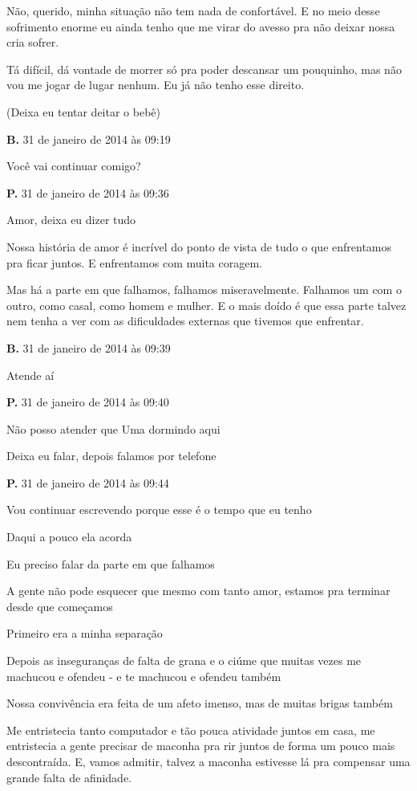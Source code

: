 Não, querido, minha situação não tem nada de confortável. E no meio
desse sofrimento enorme eu ainda tenho que me virar do avesso pra não
deixar nossa cria sofrer.

Tá difícil, dá vontade de morrer só pra poder descansar um pouquinho,
mas não vou me jogar de lugar nenhum. Eu já não tenho esse direito.

(Deixa eu tentar deitar o bebê)

\textbf{B.} 31 de janeiro de 2014 às 09:19

Você vai continuar comigo?

\textbf{P.} 31 de janeiro de 2014 às 09:36

Amor, deixa eu dizer tudo

Nossa história de amor é incrível do ponto de vista de tudo o que
enfrentamos pra ficar juntos. E enfrentamos com muita coragem.

Mas há a parte em que falhamos, falhamos miseravelmente. Falhamos um com
o outro, como casal, como homem e mulher. E o mais doído é que essa
parte talvez nem tenha a ver com as dificuldades externas que tivemos
que enfrentar.

\textbf{B.} 31 de janeiro de 2014 às 09:39

Atende aí

\textbf{P.} 31 de janeiro de 2014 às 09:40

Não posso atender que Uma dormindo aqui

Deixa eu falar, depois falamos por telefone

\textbf{P.} 31 de janeiro de 2014 às 09:44

Vou continuar escrevendo porque esse é o tempo que eu tenho

Daqui a pouco ela acorda

Eu preciso falar da parte em que falhamos

A gente não pode esquecer que mesmo com tanto amor, estamos pra terminar
desde que começamos

Primeiro era a minha separação

Depois as inseguranças de falta de grana e o ciúme que muitas vezes me
machucou e ofendeu - e te machucou e ofendeu também

Nossa convivência era feita de um afeto imenso, mas de muitas brigas
também

Me entristecia tanto computador e tão pouca atividade juntos em casa, me
entristecia a gente precisar de maconha pra rir juntos de forma um pouco
mais descontraída. E, vamos admitir, talvez a maconha estivesse lá pra
compensar uma grande falta de afinidade.

